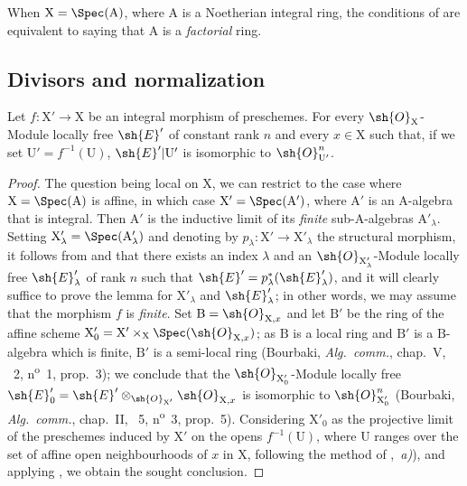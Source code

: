 \begin{remark}[21.7.7]
\label{IV.21.7.7}
When $\mathrm{X}=\Spec(\mathrm{A})$, where $\mathrm{A}$ is a Noetherian integral ring, the conditions of  are equivalent to saying that $\mathrm{A}$ is a \emph{factorial} ring.
\end{remark}


\subsection{Divisors and normalization}
\label{subsection:IV.21.8}

\begin{lemma}[21.8.1]
\label{IV.21.8.1}
Let $f:\mathrm{X}'\to\mathrm{X}$ be an integral morphism of preschemes.
For every $\sh{O}_{\mathrm{X}}$-Module locally free $\sh{E}'$ of constant rank $n$ and every $x\in\mathrm{X}$ such that, if we set $\mathrm{U}'=f^{-1}(\mathrm{U})$, $\sh{E}'|\mathrm{U}'$ is isomorphic to $\sh{O}_{\mathrm{U}'}^n$.
\end{lemma}

\begin{proof}
The question being local on $\mathrm{X}$, we can restrict to the case where $\mathrm{X}=\Spec(\mathrm{A})$ is affine, in which case $\mathrm{X}'=\Spec(\mathrm{A}')$, where $\mathrm{A}'$ is an $\mathrm{A}$-algebra that is integral.
Then $\mathrm{A}'$ is the inductive limit of its \emph{finite} sub-$\mathrm{A}$-algebras $\mathrm{A}'_\lambda$.
Setting $\mathrm{X}'_\lambda=\Spec(\mathrm{A}'_\lambda)$ and denoting by $p_\lambda:\mathrm{X}'\to\mathrm{X}'_\lambda$ the structural morphism, it follows from  and  that there exists an index $\lambda$ and an $\sh{O}_{\mathrm{X}'_\lambda}$-Module locally free $\sh{E}'_\lambda$ of rank $n$ such that $\sh{E}'=p_\lambda^*(\sh{E}'_\lambda)$, and it will clearly suffice to prove the lemma for $\mathrm{X}'_\lambda$ and $\sh{E}'_\lambda$;
in other words, we may assume that the morphism $f$ is \emph{finite}.
Set $\mathrm{B}=\sh{O}_{\mathrm{X},x}$ and let $\mathrm{B}'$ be the ring of the affine scheme $\mathrm{X}'_0=\mathrm{X}'\times_\mathrm{X}\Spec(\sh{O}_{\mathrm{X},x})$;
as $\mathrm{B}$ is a local ring and $\mathrm{B}'$ is a $\mathrm{B}$-algebra which is finite, $\mathrm{B}'$ is a semi-local ring (Bourbaki, \emph{Alg.\ comm.}, chap.~V, \textsection~2, n\textsuperscript{o}~1, prop.~3);
we conclude that the $\sh{O}_{\mathrm{X}'_0}$-Module locally free $\sh{E}'_0=\sh{E}'\otimes_{\sh{O}_{\mathrm{X}'}}\sh{O}_{\mathrm{X},x}$ is isomorphic to $\sh{O}_{\mathrm{X}'_0}^n$ (Bourbaki, \emph{Alg.\ comm.}, chap.~II, \textsection~5, n\textsuperscript{o}~3, prop.~5).
Considering $\mathrm{X}'_0$ as the
projective limit of the preschemes induced by $\mathrm{X}'$ on the opens $f^{-1}(\mathrm{U})$, where $\mathrm{U}$ ranges over the set of affine open neighbourhoods of $x$ in $\mathrm{X}$, following the method of ,{}~\emph{a)}), and applying , we obtain the sought conclusion.
\end{proof}

